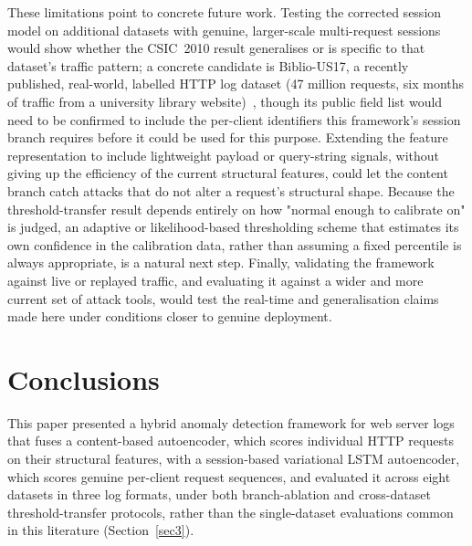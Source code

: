 \documentclass[futureinternet,article,submit,moreauthors]{Definitions/mdpi}
\begin{document}
These limitations point to concrete future work. Testing the corrected session model on additional datasets with genuine, larger-scale multi-request sessions would show whether the CSIC~2010 result generalises or is specific to that dataset's traffic pattern; a concrete candidate is Biblio-US17, a recently published, real-world, labelled HTTP log dataset (47 million requests, six months of traffic from a university library website)~\cite{diazverdejo2025}, though its public field list would need to be confirmed to include the per-client identifiers this framework's session branch requires before it could be used for this purpose. Extending the feature representation to include lightweight payload or query-string signals, without giving up the efficiency of the current structural features, could let the content branch catch attacks that do not alter a request's structural shape. Because the threshold-transfer result depends entirely on how "normal enough to calibrate on" is judged, an adaptive or likelihood-based thresholding scheme that estimates its own confidence in the calibration data, rather than assuming a fixed percentile is always appropriate, is a natural next step. Finally, validating the framework against live or replayed traffic, and evaluating it against a wider and more current set of attack tools, would test the real-time and generalisation claims made here under conditions closer to genuine deployment.

\section{Conclusions} \label{sec7}

This paper presented a hybrid anomaly detection framework for web server logs that fuses a content-based autoencoder, which scores individual HTTP requests on their structural features, with a session-based variational LSTM autoencoder, which scores genuine per-client request sequences, and evaluated it across eight datasets in three log formats, under both branch-ablation and cross-dataset threshold-transfer protocols, rather than the single-dataset evaluations common in this literature (Section~\ref{sec3}).
\end{document}
